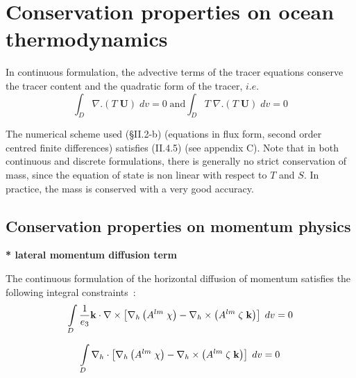 \documentclass[../tex_main/NEMO_manual]{subfiles}
\begin{document}
\section{Conservation properties on ocean thermodynamics}
\label{sec:Invariant_tra}

In continuous formulation, the advective terms of the tracer equations conserve the tracer content and
the quadratic form of the tracer, $i.e.$
\begin{equation} \label{eq:tra_tra2}
\int_D {\nabla .\left( {T\;{\textbf{U}}} \right)\;dv} =0
\;\text{and}
\int_D {T\;\nabla .\left( {T\;{\textbf{U}}} \right)\;dv} =0
\end{equation}

The numerical scheme used ({\S}II.2-b) (equations in flux form, second order centred finite differences) satisfies
(II.4.5) (see appendix C).
Note that in both continuous and discrete formulations, there is generally no strict conservation of mass,
since the equation of state is non linear with respect to $T$ and $S$.
In practice, the mass is conserved with a very good accuracy. 

\subsection{Conservation properties on momentum physics}
\label{subsec:Invariant_dyn_physics}

\textbf{* lateral momentum diffusion term}

The continuous formulation of the horizontal diffusion of momentum satisfies the following integral constraints~:
\begin{equation} \label{eq:dynldf_dyn}
\int\limits_D {\frac{1}{e_3 }{\rm {\bf k}}\cdot \nabla \times \left[ {\nabla 
_h \left( {A^{lm}\;\chi } \right)-\nabla _h \times \left( {A^{lm}\;\zeta 
\;{\rm {\bf k}}} \right)} \right]\;dv} =0
\end{equation}

\begin{equation} \label{eq:dynldf_div}
\int\limits_D {\nabla _h \cdot \left[ {\nabla _h \left( {A^{lm}\;\chi } 
\right)-\nabla _h \times \left( {A^{lm}\;\zeta \;{\rm {\bf k}}} \right)} 
\right]\;dv} =0
\end{equation}
\end{document}

